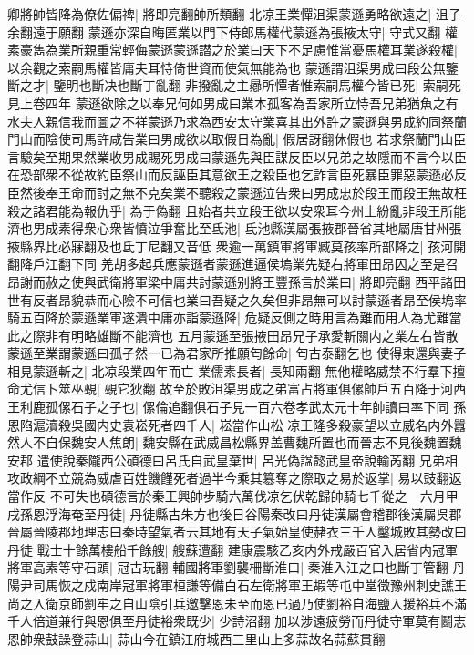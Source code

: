 卿將帥皆降為僚佐偏禆|{
	將即亮翻帥所類翻}
北凉王業憚沮渠蒙遜勇略欲遠之|{
	沮子余翻遠于願翻}
蒙遜亦深自晦匿業以門下侍郎馬權代蒙遜為張掖太守|{
	守式又翻}
權素豪雋為業所親重常輕侮蒙遜蒙遜譛之於業曰天下不足慮惟當憂馬權耳業遂殺權|{
	以余觀之索嗣馬權皆庸夫耳恃倚世資而使氣無能為也}
蒙遜謂沮渠男成曰段公無鑒斷之才|{
	鑒明也斷决也斷丁亂翻}
非撥亂之主曏所憚者惟索嗣馬權今皆已死|{
	索嗣死見上卷四年}
蒙遜欲除之以奉兄何如男成曰業本孤客為吾家所立恃吾兄弟猶魚之有水夫人親信我而圖之不祥蒙遜乃求為西安太守業喜其出外許之蒙遜與男成約同祭蘭門山而陰使司馬許咸告業曰男成欲以取假日為亂|{
	假居訝翻休假也}
若求祭蘭門山臣言驗矣至期果然業收男成賜死男成曰蒙遜先與臣謀反臣以兄弟之故隱而不言今以臣在恐部衆不從故約臣祭山而反誣臣其意欲王之殺臣也乞詐言臣死暴臣罪惡蒙遜必反臣然後奉王命而討之無不克矣業不聽殺之蒙遜泣告衆曰男成忠於段王而段王無故枉殺之諸君能為報仇乎|{
	為于偽翻}
且始者共立段王欲以安衆耳今州土紛亂非段王所能濟也男成素得衆心衆皆憤泣爭奮比至氐池|{
	氐池縣漢屬張掖郡晉省其地屬唐甘州張掖縣界比必寐翻及也氐丁尼翻又音低}
衆逾一萬鎮軍將軍臧莫孩率所部降之|{
	孩河開翻降戶江翻下同}
羌胡多起兵應蒙遜者蒙遜進逼侯塢業先疑右將軍田昂囚之至是召昂謝而赦之使與武衛將軍梁中庸共討蒙遜别將王豐孫言於業曰|{
	將即亮翻}
西平諸田世有反者昂貌恭而心險不可信也業曰吾疑之久矣但非昂無可以討蒙遜者昂至侯塢率騎五百降於蒙遜業軍遂潰中庸亦詣蒙遜降|{
	危疑反側之時用言為難而用人為尤難當此之際非有明略雄斷不能濟也}
五月蒙遜至張掖田昂兄子承愛斬關内之業左右皆散蒙遜至業謂蒙遜曰孤孑然一已為君家所推願匄餘命|{
	匄古泰翻乞也}
使得東還與妻子相見蒙遜斬之|{
	北凉段業四年而亡}
業儒素長者|{
	長知兩翻}
無他權略威禁不行羣下擅命尤信卜筮巫覡|{
	覡它狄翻}
故至於敗沮渠男成之弟富占將軍俱傫帥戶五百降于河西王利鹿孤傫石子之子也|{
	傫倫追翻俱石子見一百六卷孝武太元十年帥讀曰率下同}
孫恩陷滬瀆殺吳國内史袁崧死者四千人|{
	崧當作山松}
凉王隆多殺豪望以立威名内外囂然人不自保魏安人焦朗|{
	魏安縣在武威昌松縣界盖曹魏所置也而晉志不見後魏置魏安郡}
遣使說秦隴西公碩德曰呂氏自武皇棄世|{
	呂光偽諡懿武皇帝說輸芮翻}
兄弟相攻政綱不立競為威虐百姓饑饉死者過半今乘其簒奪之際取之易於返掌|{
	易以豉翻返當作反}
不可失也碩德言於秦王興帥步騎六萬伐凉乞伏乾歸帥騎七千從之　六月甲戌孫恩浮海奄至丹徒|{
	丹徒縣古朱方也後日谷陽秦改曰丹徒漢屬會稽郡後漢屬吳郡晉屬晉陵郡地理志曰秦時望氣者云其地有天子氣始皇使赭衣三千人鑿城敗其勢改曰丹徒}
戰士十餘萬樓船千餘艘|{
	艘蘇遭翻}
建康震駭乙亥内外戒嚴百官入居省内冠軍將軍高素等守石頭|{
	冠古玩翻}
輔國將軍劉襲柵斷淮口|{
	秦淮入江之口也斷丁管翻}
丹陽尹司馬恢之戍南岸冠軍將軍桓謙等備白石左衛將軍王嘏等屯中堂徵豫州刺史譙王尚之入衛京師劉牢之自山陰引兵邀擊恩未至而恩已過乃使劉裕自海鹽入援裕兵不滿千人倍道兼行與恩俱至丹徒裕衆既少|{
	少詩沼翻}
加以涉遠疲勞而丹徒守軍莫有鬭志恩帥衆鼓譟登蒜山|{
	蒜山今在鎮江府城西三里山上多蒜故名蒜蘇貫翻}

